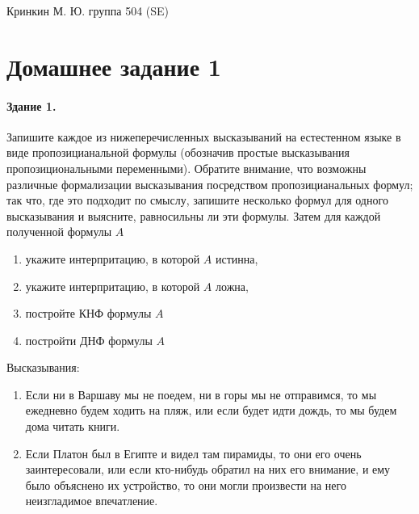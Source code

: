 \documentclass[a4paper,12pt]{article}
\begin{document}
\sloppy

\lstset{
	basicstyle=\small,
	stringstyle=\ttfamily,
	showstringspaces=false,
	columns=fixed,
	breaklines=true,
	numbers=right,
	numberstyle=\tiny
}

\newtheorem{Def}{Определение}[section]
\newtheorem{Th}{Теорема}
\newtheorem{Lem}[Th]{Лемма}
\newenvironment{Proof}
	{\par\noindent{\bf Доказательство.}}
	{\hfill$\scriptstyle\blacksquare$}
\newenvironment{Solution}
	{\par\noindent{\bf Решение.}}
	{\hfill$\scriptstyle\blacksquare$}


\begin{flushright}
	Кринкин М. Ю. группа 504 (SE)
\end{flushright}

\section{Домашнее задание 1}

\paragraph{Здание 1.} Запишите каждое из нижеперечисленных высказываний на естестенном языке в виде пропозицианальной формулы (обозначив простые высказывания пропозициональными переменными). Обратите внимание, что возможны различные формализации высказывания посредством пропозицианальных формул; так что, где это подходит по смыслу, запишите несколько формул для одного высказывания и выясните, равносильны ли эти формулы. Затем для каждой полученной формулы $A$
\begin{enumerate}
\item укажите интерпритацию, в которой $A$ истинна,

\item укажите интерпритацию, в которой $A$ ложна,

\item постройте КНФ формулы $A$

\item постройти ДНФ формулы $A$
\end{enumerate}

Высказывания:

\begin{enumerate}
\item Если ни в Варшаву мы не поедем, ни в горы мы не отправимся, то мы ежедневно будем ходить на пляж, или если будет идти дождь, то мы будем дома читать книги.

\item Если Платон был в Египте и видел там пирамиды, то они его очень заинтересовали, или если кто-нибудь обратил на них его внимание, и ему было объяснено их устройство, то они могли произвести на него неизгладимое впечатление.
\end{enumerate}
\end{document}
